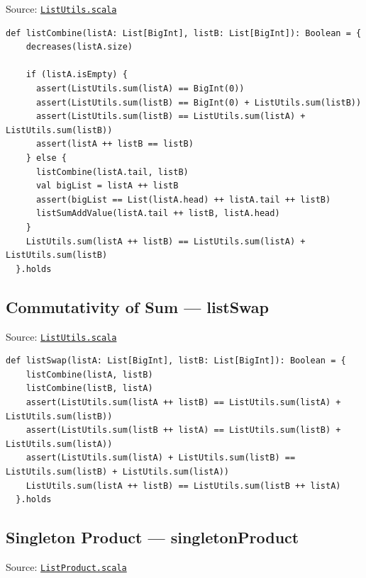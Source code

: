 Source:
\href{https://github.com/thiagomata/prime-numbers/blob/list-article-v1.0.0/src/main/scala/v1/chapter3/list/ListUtils.scala}{\texttt{ListUtils.scala}}

\begin{lstlisting}[style=scala]
  def listCombine(listA: List[BigInt], listB: List[BigInt]): Boolean = {
    decreases(listA.size)

    if (listA.isEmpty) {
      assert(ListUtils.sum(listA) == BigInt(0))
      assert(ListUtils.sum(listB) == BigInt(0) + ListUtils.sum(listB))
      assert(ListUtils.sum(listB) == ListUtils.sum(listA) + ListUtils.sum(listB))
      assert(listA ++ listB == listB)
    } else {
      listCombine(listA.tail, listB)
      val bigList = listA ++ listB
      assert(bigList == List(listA.head) ++ listA.tail ++ listB)
      listSumAddValue(listA.tail ++ listB, listA.head)
    }
    ListUtils.sum(listA ++ listB) == ListUtils.sum(listA) + ListUtils.sum(listB)
  }.holds
\end{lstlisting}

\subsection{Commutativity of Sum --- listSwap}

Source:
\href{https://github.com/thiagomata/prime-numbers/blob/list-article-v1.0.0/src/main/scala/v1/chapter3/list/ListUtils.scala}{\texttt{ListUtils.scala}}

\begin{lstlisting}[style=scala]
  def listSwap(listA: List[BigInt], listB: List[BigInt]): Boolean = {
    listCombine(listA, listB)
    listCombine(listB, listA)
    assert(ListUtils.sum(listA ++ listB) == ListUtils.sum(listA) + ListUtils.sum(listB))
    assert(ListUtils.sum(listB ++ listA) == ListUtils.sum(listB) + ListUtils.sum(listA))
    assert(ListUtils.sum(listA) + ListUtils.sum(listB) == ListUtils.sum(listB) + ListUtils.sum(listA))
    ListUtils.sum(listA ++ listB) == ListUtils.sum(listB ++ listA)
  }.holds
\end{lstlisting}

\subsection{Singleton Product --- singletonProduct}

Source:
\href{https://github.com/thiagomata/prime-numbers/blob/list-article-v1.0.0/src/main/scala/v1/chapter3/list/properties/ListProduct.scala}{\texttt{ListProduct.scala}}

